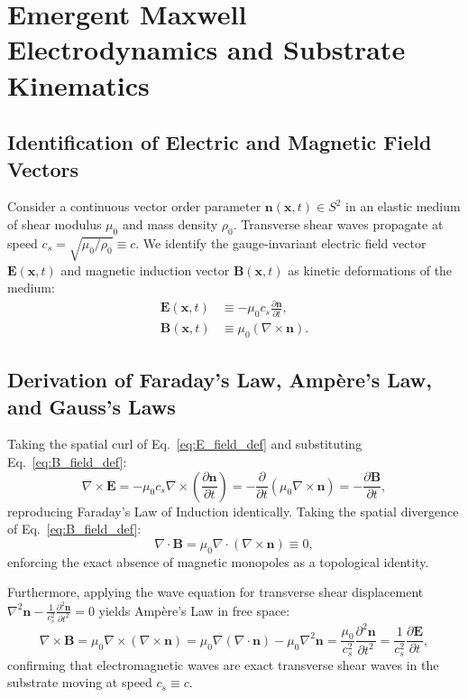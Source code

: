 \documentclass[11pt,a4paper]{article}
\begin{document}
	\section{Emergent Maxwell Electrodynamics and Substrate Kinematics}
	\label{sec:emergent_maxwell}
	
	\subsection{Identification of Electric and Magnetic Field Vectors}
	Consider a continuous vector order parameter $\mathbf{n}(\mathbf{x}, t) \in S^2$ in an elastic medium of shear modulus $\mu_0$ and mass density $\rho_0$. Transverse shear waves propagate at speed $c_s = \sqrt{\mu_0 / \rho_0} \equiv c$. We identify the gauge-invariant electric field vector $\mathbf{E}(\mathbf{x}, t)$ and magnetic induction vector $\mathbf{B}(\mathbf{x}, t)$ as kinetic deformations of the medium:
	\begin{align}
		\mathbf{E}(\mathbf{x}, t) &\equiv -\mu_0 c_s \frac{\partial \mathbf{n}}{\partial t}, \label{eq:E_field_def} \\
		\mathbf{B}(\mathbf{x}, t) &\equiv \mu_0 (\nabla \times \mathbf{n}). \label{eq:B_field_def}
	\end{align}
	
	\subsection{Derivation of Faraday's Law, Ampère's Law, and Gauss's Laws}
	Taking the spatial curl of Eq.\ \eqref{eq:E_field_def} and substituting Eq.\ \eqref{eq:B_field_def}:
	\begin{equation}
		\nabla \times \mathbf{E} = -\mu_0 c_s \nabla \times \left( \frac{\partial \mathbf{n}}{\partial t} \right) = -\frac{\partial}{\partial t} \left( \mu_0 \nabla \times \mathbf{n} \right) = -\frac{\partial \mathbf{B}}{\partial t},
		\label{eq:faraday_derived}
	\end{equation}
	reproducing Faraday's Law of Induction identically. Taking the spatial divergence of Eq.\ \eqref{eq:B_field_def}:
	\begin{equation}
		\nabla \cdot \mathbf{B} = \mu_0 \nabla \cdot (\nabla \times \mathbf{n}) \equiv 0,
		\label{eq:gauss_magnetism_derived}
	\end{equation}
	enforcing the exact absence of magnetic monopoles as a topological identity.
	
	Furthermore, applying the wave equation for transverse shear displacement $\nabla^2 \mathbf{n} - \frac{1}{c_s^2} \frac{\partial^2 \mathbf{n}}{\partial t^2} = 0$ yields Ampère's Law in free space:
	\begin{equation}
		\nabla \times \mathbf{B} = \mu_0 \nabla \times (\nabla \times \mathbf{n}) = \mu_0 \nabla(\nabla \cdot \mathbf{n}) - \mu_0 \nabla^2 \mathbf{n} = \frac{\mu_0}{c_s^2} \frac{\partial^2 \mathbf{n}}{\partial t^2} = \frac{1}{c_s^2} \frac{\partial \mathbf{E}}{\partial t},
		\label{eq:ampere_derived}
	\end{equation}
	confirming that electromagnetic waves are exact transverse shear waves in the substrate moving at speed $c_s \equiv c$.
	
\end{document}
